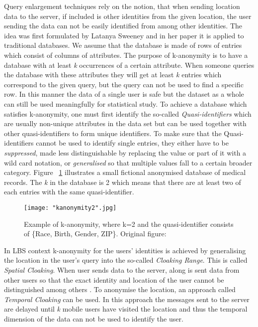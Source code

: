 \documentclass[english]{tktltiki2}
\theoremstyle{definition}
\theoremstyle{remark}
\begin{document}
Query enlargement techniques rely on the notion, that when sending location data to the server, if included is other identities from the given location, the user sending the data can not be easily identified from among other identities. The idea was first formulated by Latanya Sweeney\cite{Sweeney:2002:KAM:774544.774552} and in her paper it is applied to traditional databases. We assume that the database is made of rows of entries which consist of columns of attributes. The purpose of k-anonymity is to have a database with at least \textit{k} occurrences of a certain attribute. When someone queries the database with these attributes they will get at least \textit{k} entries which correspond to the given query, but the query can not be used to find a specific row. In this manner the data of a single user is safe but the dataset as a whole can still be used meaningfully for statistical study. To achieve a database which satisfies k-anonymity, one must first identify the so-called \textit{Quasi-identifiers} which are usually non-unique attributes in the data set but can be used together with other quasi-identifiers to form unique identifiers. To make sure that the Quasi-identifiers cannot be used to identify single entries, they either have to be \textit{suppressed}, made less distinguishable by replacing the value or part of it with a wild card notation, or \textit{generalised} so that multiple values fall to a certain broader category. Figure ~\ref{fig:kanonymity2} illustrates a small fictional anonymised database of medical records. The \textit{k} in the database is 2 which means that there are at least two of each entries with the same quasi-identifier.

\begin{figure}[H]
\centering
{}
\texttt{[image: "kanonymity2".jpg]}
\caption{Example of k-anonymity, where k=2 and the quasi-identifier consists of \{Race, Birth, Gender, ZIP\}. Original figure: \cite{Sweeney:2002:KAM:774544.774552} }
\label{fig:kanonymity2}
\end{figure} 

In LBS context k-anonymity for the users' identities is achieved by generalising the location in the user's query into the so-called \textit{Cloaking Range}. This is called \textit{Spatial Cloaking}. When user sends data to the server, along is sent data from other users so that the exact identity and location of the user cannot be distinguished among others \cite{Gedik2008}. To anonymise the location, an approach called \textit{Temporal Cloaking} can be used. In this approach the messages sent to the server are delayed until \textit{k} mobile users have visited the location and thus the temporal dimension of the data can not be used to identify the user.
\end{document}
